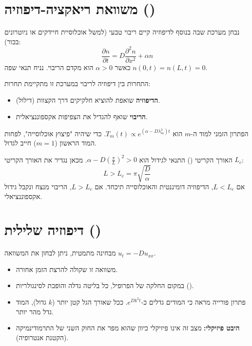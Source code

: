 \section{משוואת ריאקציה-דיפוזיה ()}
נבחן מערכת שבה בנוסף לדיפוזיה קיים ריבוי טבעי (למשל אוכלוסיית חיידקים או ניוטרונים בכור):
\[ \frac{\partial n}{\partial t} = D \frac{\partial^2 n}{\partial x^2} + \alpha n \]
כאשר $\alpha > 0$ הוא מקדם הריבוי. נניח תנאי שפה $n(0,t)=n(L,t)=0$.

\begin{theorembox}{התחרות בין דיפוזיה לריבוי}
במערכת זו מתקיימת תחרות:
\begin{itemize}
    \item \textbf{הדיפוזיה} שואפת להוציא חלקיקים דרך הקצוות (דילול).
    \item \textbf{הריבוי} שואף להגדיל את הצפיפות אקספוננציאלית.
\end{itemize}
הפתרון הזמני למוד ה-$m$ הוא $T_m(t) \propto e^{(\alpha - D \lambda_m^2) t}$.
כדי שיהיה "פיצוץ אוכלוסייה", לפחות המוד הראשון ($m=1$) חייב לגדול.
\end{theorembox}

\begin{resultbox}{האורך הקריטי ()}
התנאי לגידול הוא $\alpha - D \left(\frac{\pi}{L}\right)^2 > 0$. מכאן נגדיר את האורך הקריטי $L_c$:
\[ L > L_c = \pi \sqrt{\frac{D}{\alpha}} \]
אם $L < L_c$, הדיפוזיה דומיננטית והאוכלוסייה תיכחד. אם $L > L_c$, הריבוי מנצח ונקבל גידול אקספוננציאלי.
\end{resultbox}

\section{דיפוזיה שלילית ()}
מבחינה מתמטית, ניתן לבחון את המשוואה $u_t = -D u_{xx}$.
\begin{itemize}
    \item משוואה זו שקולה להרצת הזמן אחורה.
    \item במקום החלקה של הפרופיל, כל בליטה גדלה והופכת לסינגולריות ().
    \item פתרון פורייה מראה כי המודים גדלים כ-$e^{D k^2 t}$. ככל שאורך הגל קטן יותר ($k$ גדול), המוד גדל מהר יותר.
    \item \textbf{היבט פיזיקלי:} מצב זה אינו פיזיקלי כיוון שהוא מפר את החוק השני של התרמודינמיקה (הקטנת אנטרופיה).
\end{itemize}

\begin{center}
\end{center}


